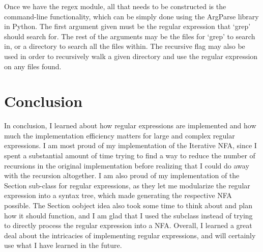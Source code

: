 \documentclass{article}
\begin{document}
\indent Once we have the regex module, all that needs to be constructed is the command-line functionality, which can be simply done using the ArgParse library in Python. The first argument given must be the regular expression that `grep' should search for. The rest of the arguments may be the files for `grep' to search in, or a directory to search all the files within. The recursive flag may also be used in order to recursively walk a given directory and use the regular expression on any files found.\\

\section*{Conclusion}
In conclusion, I learned about how regular expressions are implemented and how much the implementation efficiency matters for large and complex regular expressions. I am most proud of my implementation of the Iterative NFA, since I spent a substantial amount of time trying to find a way to reduce the number of recursions in the original implementation before realizing that I could do away with the recursion altogether. I am also proud of my implementation of the Section sub-class for regular expressions, as they let me modularize the regular expression into a syntax tree, which made generating the respective NFA possible. The Section oobject idea also took some time to think about and plan how it should function, and I am glad that I used the subclass instead of trying to directly process the regular expression into a NFA. Overall, I learned a great deal about the intricacies of implementing regular expressions, and will certainly use what I have learned in the future.\\
\end{document}
